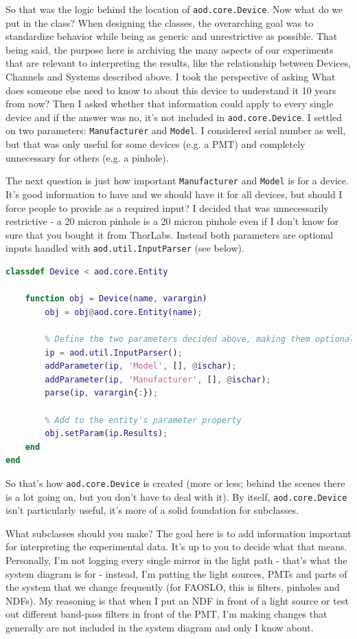 \documentclass[10pt]{exam}
\newcommand\aodparam[1]{\textcolor{codepurple}{\texttt{#1}}}
\newcommand\aodclass[1]{\textcolor{codeblue}{\texttt{#1}}}
\begin{document}
		So that was the logic behind the location of \aodclass{aod.core.Device}. Now what do we put in the class? When designing the classes, the overarching goal was to standardize behavior while being as generic and unrestrictive as possible. 
		That being said, the purpose here is archiving the many aspects of our experiments that are relevant to interpreting the results, like the relationship between Devices, Channels and Systems described above. I took the perspective of asking What does someone else need to know to about this device to understand it 10 years from now? Then I asked whether that information could apply to every single device and if the answer was no, it's not included in \aodclass{aod.core.Device}. I settled on two parameters: \aodparam{Manufacturer} and \aodparam{Model}. I considered serial number as well, but that was only useful for some devices (e.g. a PMT) and completely unnecessary for others (e.g. a pinhole).

		The next question is just how important \aodparam{Manufacturer} and \aodparam{Model} is for a device. It's good information to have and we should have it for all devices, but should I force people to provide as a required input? I decided that was unnecessarily restrictive - a 20 micron pinhole is a 20 micron pinhole even if I don't know for sure that you bought it from ThorLabs. Instead both parameters are optional inputs handled with \aodclass{aod.util.InputParser} (see below).
		\begin{lstlisting}[language=matlab]
classdef Device < aod.core.Entity
	
	function obj = Device(name, varargin)
		obj = obj@aod.core.Entity(name);
		
		% Define the two parameters decided above, making them optional
		ip = aod.util.InputParser();
		addParameter(ip, 'Model', [], @ischar);
		addParameter(ip, 'Manufacturer', [], @ischar);
		parse(ip, varargin{:});
		
		% Add to the entity's parameter property
		obj.setParam(ip.Results);
	end
end
		\end{lstlisting}
	\noindent So that's how \aodclass{aod.core.Device} is created (more or less; behind the scenes there is a lot going on, but you don't have to deal with it). 
	By itself, \aodclass{aod.core.Device} isn't particularly useful, it's more of a solid foundation for subclasses. 
	
	What subclasses should you make? The goal here is to add information important for interpreting the experimental data. It's up to you to decide what that means. Personally, I'm not logging every single mirror in the light path - that's what the system diagram is for - instead, I'm putting the light sources, PMTs and parts of the system that we change frequently (for FAOSLO, this is filters, pinholes and NDFs). My reasoning is that when I put an NDF in front of a light source or test out different band-pass filters in front of the PMT, I'm making changes that generally are not included in the system diagram and only I know about. 
	
\end{document}
